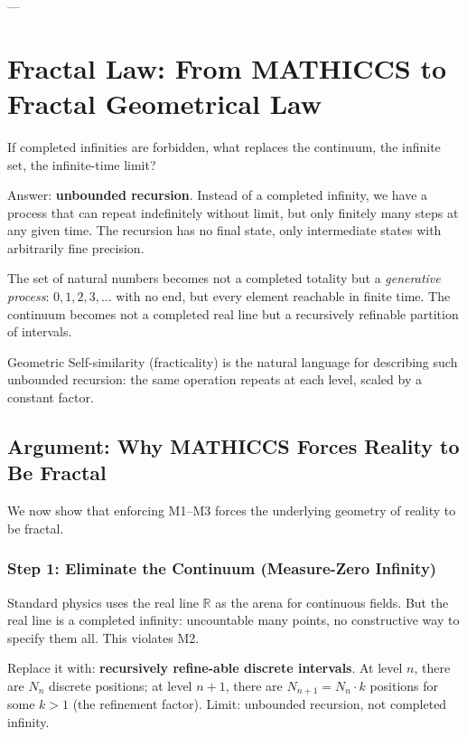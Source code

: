 \documentclass[11pt,a4paper]{article}
\begin{document}
---


\section{Fractal Law: From MATHICCS to Fractal Geometrical Law}

  If completed infinities are forbidden, what replaces the continuum, the infinite set, the infinite-time limit?

  Answer: \textbf{unbounded recursion}. Instead of a completed infinity, we have a process that can repeat indefinitely without limit, but only finitely many steps at any given time. The recursion has no final state, only intermediate states with arbitrarily fine precision.

  The set of natural numbers becomes not a completed totality but a \textit{generative process}: $0, 1, 2, 3, \ldots$ with no end, but every element reachable in finite time. The continuum becomes not a completed real line but a recursively refinable partition of intervals.

  Geometric Self-similarity (fracticality) is the natural language for describing such unbounded recursion: the same operation repeats at each level, scaled by a constant factor.

  \subsection{Argument: Why MATHICCS Forces Reality to Be Fractal}

  We now show that enforcing M1--M3 forces the underlying geometry of reality to be fractal.

  \subsubsection{Step 1: Eliminate the Continuum (Measure-Zero Infinity)}

  Standard physics uses the real line $\mathbb{R}$ as the arena for continuous fields. But the real line is a completed infinity: uncountable many points, no constructive way to specify them all. This violates M2.

  Replace it with: \textbf{recursively refine-able discrete intervals}. At level $n$, there are $N_n$ discrete positions; at level $n+1$, there are $N_{n+1} = N_n \cdot k$ positions for some $k > 1$ (the refinement factor). Limit: unbounded recursion, not completed infinity. 
\end{document}
